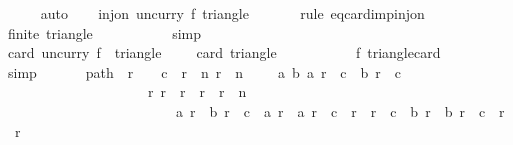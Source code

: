 \begin{isabellebody}
\ \ \ \ \isamarkupfalse%
\ auto\isanewline
\isanewline
\ \ \isamarkupfalse%
\ {\isachardoublequoteopen}inj{\isacharunderscore}on\ {\isacharparenleft}uncurry\ f{\isacharparenright}\ {\isacharparenleft}triangle\ {}\ {}\ {}{}{}{}{\isacharparenright}{\isachardoublequoteclose}\isanewline
\ \ \isamarkupfalse%
\ {\isacharparenleft}rule\ eq{\isacharunderscore}card{\isacharunderscore}imp{\isacharunderscore}inj{\isacharunderscore}on{\isacharparenright}\isanewline
\ \ \ \ \isamarkupfalse%
\ {\isachardoublequoteopen}finite\ {\isacharparenleft}triangle\ {}\ {}\ {}{}{}{}{\isacharparenright}{\isachardoublequoteclose}\isanewline
\ \ \ \ \ \ \isamarkupfalse%
\ simp\isanewline
\ \ \isamarkupfalse%
\isanewline
\ \ \ \ \isamarkupfalse%
\ {\isachardoublequoteopen}card\ {\isacharparenleft}{\isacharparenleft}uncurry\ f{\isacharparenright}\ {\isacharbackquote}\ triangle\ {}\ {}\ {}{}{}{}{\isacharparenright}\ {\isacharequal}\ card\ {\isacharparenleft}triangle\ {}\ {}\ {}{}{}{}{\isacharparenright}{\isachardoublequoteclose}\isanewline
\ \ \ \ \ \ \isamarkupfalse%
\ f{\isacharparenleft}{}{\isacharparenright}\ triangle{\isacharunderscore}card\isanewline
\ \ \ \ \ \ \isamarkupfalse%
\ simp\isanewline
\ \ \isamarkupfalse%
\isanewline
\isanewline
\ \ \isamarkupfalse%
\ path{\isacharcolon}\ {\isachardoublequoteopen}{\isasymforall}\ r{}\ {\isacharless}\ {}{}{}{}{\isachardot}\ {\isasymforall}\ c{}\ {\isasymle}\ r{}{\isachardot}\ {\isasymforall}\ n{\isachardot}\ r{}\ {\isacharplus}\ n\ {\isasymle}\ {}{}{}{}\ {\isasymlongrightarrow}\ {\isacharparenleft}{\isasymexists}\ a\ b{\isachardot}\ a\ r{}\ {\isacharequal}\ c{}\ {\isasymand}\ b\ r{}\ {\isacharequal}\ c{}\ {\isasymand}\ \isanewline
\ \ \ \ \ \ \ \ \ \ \ \ \ \ \ \ \ \ \ \ {\isacharparenleft}{\isasymforall}\ r{\isachardot}\ r{}\ {\isacharless}\ r\ {\isasymand}\ r\ {\isacharless}\ r{}\ {\isacharplus}\ n\ {\isasymlongrightarrow}\ \isanewline
\ \ \ \ \ \ \ \ \ \ \ \ \ \ \ \ \ \ \ \ \ \ \ \ \ a\ r\ {\isasymnoteq}\ b\ r\ {\isasymand}\ c{}\ {\isasymle}\ a\ r\ {\isasymand}\ a\ r\ {\isasymle}\ c{}\ {\isacharplus}\ {\isacharparenleft}r\ {\isacharminus}\ r{}{\isacharparenright}\ {\isasymand}\ c{}\ {\isasymle}\ b\ r\ {\isasymand}\ b\ r\ {\isasymle}\ c{}\ {\isacharplus}\ {\isacharparenleft}r\ {\isacharminus}\ r{}{\isacharparenright}\ {\isasymand}\isanewline

\end{isabellebody}
